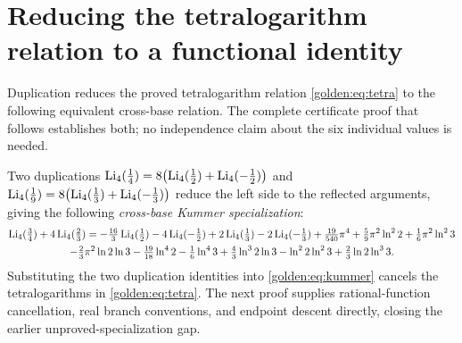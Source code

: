 \section{Reducing the tetralogarithm relation to a functional identity}
Duplication reduces the proved tetralogarithm relation
\eqref{golden:eq:tetra} to the following equivalent cross-base relation.
The complete certificate proof that follows establishes both;
no independence claim about the six individual values is needed.

Two duplications
$\operatorname{Li}_4(\tfrac14)=8\bigl(\operatorname{Li}_4(\tfrac12)+\operatorname{Li}_4(-\tfrac12)\bigr)$ and
$\operatorname{Li}_4(\tfrac19)=8\bigl(\operatorname{Li}_4(\tfrac13)+\operatorname{Li}_4(-\tfrac13)\bigr)$ reduce the left side to the reflected arguments,
giving the following \emph{cross-base Kummer specialization}:
{\footnotesize
\begin{multline}\label{golden:eq:kummer}
  \operatorname{Li}_4(\tfrac34)+4\operatorname{Li}_4(\tfrac23)=-\tfrac{16}3\operatorname{Li}_4(\tfrac12)-4\operatorname{Li}_4(-\tfrac12)+2\operatorname{Li}_4(\tfrac13)-2\operatorname{Li}_4(-\tfrac13)
  +\tfrac{19}{540}\pi^4+\tfrac59\pi^2\ln^2 2+\tfrac16\pi^2\ln^2 3\\
  -\tfrac23\pi^2\ln2\ln3-\tfrac{19}{18}\ln^4 2-\tfrac16\ln^4 3+\tfrac43\ln^3 2\ln3-\ln^2 2\ln^2 3+\tfrac23\ln2\ln^3 3.
\end{multline}}
Substituting the two duplication identities into
\eqref{golden:eq:kummer} cancels the tetralogarithms in
\eqref{golden:eq:tetra}. The next proof supplies rational-function
cancellation, real branch conventions, and endpoint descent directly,
closing the earlier unproved-specialization gap.



